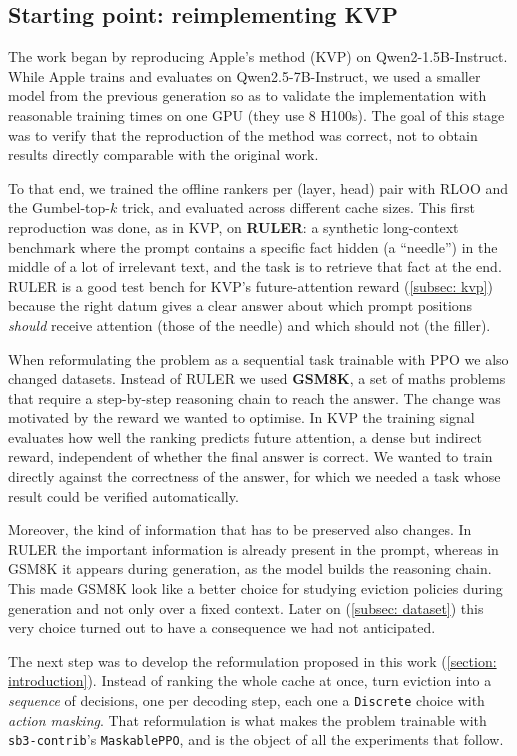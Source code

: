 \subsection{Starting point: reimplementing KVP} \label{subsec: kvp_repro}

The work began by reproducing Apple's method (KVP) on Qwen2-1.5B-Instruct. While Apple trains and evaluates on Qwen2.5-7B-Instruct, we used a smaller model from the previous generation so as to validate the implementation with reasonable training times on one GPU (they use 8 H100s). The goal of this stage was to verify that the reproduction of the method was correct, not to obtain results directly comparable with the original work.

To that end, we trained the offline rankers per (layer, head) pair with RLOO and the Gumbel-top-$k$ trick, and evaluated across different cache sizes.
This first reproduction was done, as in KVP, on \textbf{RULER}: a synthetic long-context benchmark where the prompt contains a specific fact hidden (a ``needle'') in the middle of a lot of irrelevant text, and the task is to retrieve that fact at the end. RULER is a good test bench for KVP's future-attention reward (\cref{subsec: kvp}) because the right datum gives a clear answer about which prompt positions \emph{should} receive attention (those of the needle) and which should not (the filler).

When reformulating the problem as a sequential task trainable with PPO we also changed datasets. Instead of RULER we used \textbf{GSM8K}, a set of maths problems that require a step-by-step reasoning chain to reach the answer. The change was motivated by the reward we wanted to optimise. In KVP the training signal evaluates how well the ranking predicts future attention, a dense but indirect reward, independent of whether the final answer is correct. We wanted to train directly against the correctness of the answer, for which we needed a task whose result could be verified automatically.

Moreover, the kind of information that has to be preserved also changes. In RULER the important information is already present in the prompt, whereas in GSM8K it appears during generation, as the model builds the reasoning chain. This made GSM8K look like a better choice for studying eviction policies during generation and not only over a fixed context. Later on (\cref{subsec: dataset}) this very choice turned out to have a consequence we had not anticipated.

The next step was to develop the reformulation proposed in this work (\cref{section: introduction}). Instead of ranking the whole cache at once, turn eviction into a \emph{sequence} of decisions, one per decoding step, each one a \texttt{Discrete} choice with \textit{action masking}. That reformulation is what makes the problem trainable with \texttt{sb3-contrib}'s \texttt{MaskablePPO}, and is the object of all the experiments that follow.

